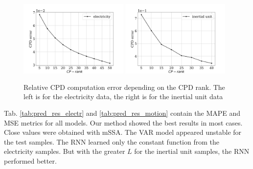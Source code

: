 \documentclass[referee, pdflatex, sn-mathphys-num]{sn-jnl}
\theoremstyle{definition}
\theoremstyle{plain}
\begin{document}
	\begin{figure}[h]
		\centering
		\includegraphics[width=0.48\textwidth, keepaspectratio]{CPD_error_elec.png}
		\includegraphics[width=0.48\textwidth, keepaspectratio]{CPD_error_motion.png}
		\caption{Relative CPD computation error depending on the CPD rank. The left is for the electricity data, the right is for the inertial unit data}\label{fig:cpd_errors}
	\end{figure}
	
	Tab. \ref{tab:pred_res_electr} and \ref{tab:pred_res_motion} contain the MAPE and MSE metrics for all models. Our method showed the best results in most cases. Close values were obtained with mSSA. The VAR model appeared unstable for the test samples. The RNN learned only the constant function from the electricity samples. But with the greater $ L $ for the inertial unit samples, the RNN performed better.
	
\end{document}
